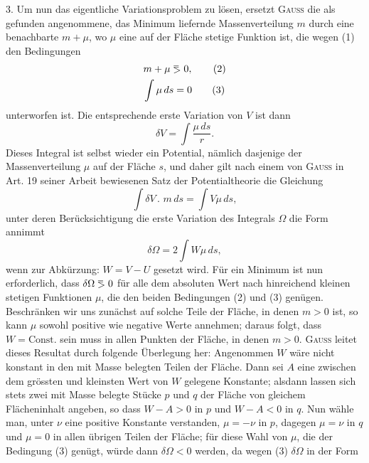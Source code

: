 \clearpage\begingroup\NoSourceHead{}
\renewcommand{\thefootnote}{\arabic{footnote})}\setcounter{footnote}{6}
\newcommand{\BolzaEqualAboveGreater}{\mathrel{\vcenter{\offinterlineskip\hbox{$\scriptstyle=$}\kern-.15ex\hbox{$>$}}}}
\noindent\hspace*{\parindent}3. Um nun das eigentliche Variationsproblem zu lösen, ersetzt \textsc{Gauss}
die als gefunden angenommene, das Minimum liefernde Massenverteilung $m$
durch eine benachbarte $m+\mu$, wo $\mu$ eine auf der Fläche stetige Funktion ist,
die wegen (1) den Bedingungen
\begin{gather*}
m+\mu\BolzaEqualAboveGreater0,\tag{2}\\
\int\mu\,ds=0\tag{3}
\end{gather*}
unterworfen ist. Die entsprechende erste Variation von $V$ ist dann
\[
\delta V=\int\frac{\mu\,ds}{r}.
\]
Dieses Integral ist selbst wieder ein Potential, nämlich dasjenige der Massenverteilung $\mu$ auf der Fläche $s$, und daher gilt nach einem von \textsc{Gauss} in Art. 19
seiner Arbeit bewiesenen Satz der Potentialtheorie die Gleichung
\[
\int\delta V\mathpunct{.}\,m\,ds=\int V\mu\,ds,
\]
unter deren Berücksichtigung die erste Variation des Integrals $\Omega$ die Form
annimmt
\[
\delta\Omega=2\int W\mu\,ds,
\]
wenn zur Abkürzung: $W=V-U$ gesetzt wird. Für ein Minimum ist nun
erforderlich, dass $\delta\Omega\BolzaEqualAboveGreater0$ für alle dem absoluten Wert nach hinreichend
kleinen stetigen Funktionen $\mu$, die den beiden Bedingungen (2) und (3) genügen. Beschränken wir uns zunächst auf solche Teile der Fläche, in denen
$m>0$ ist, so kann $\mu$ sowohl positive wie negative Werte annehmen; daraus
folgt, dass $W=\mathrm{Const.}$ sein muss in allen Punkten der Fläche, in denen
$m>0$. \textsc{Gauss} leitet dieses Resultat durch folgende Überlegung her: Angenommen $W$ wäre nicht konstant in den mit Masse belegten Teilen der Fläche.
Dann sei $A$ eine zwischen dem grössten und kleinsten Wert von $W$ gelegene
Konstante; alsdann lassen sich stets zwei mit Masse belegte Stücke $p$ und $q$
der Fläche von gleichem Flächeninhalt angeben, so dass $W-A>0$ in $p$ und
$W-A<0$ in $q$. Nun wähle man, unter $\nu$ eine positive Konstante verstanden, $\mu=-\nu$ in $p$, dagegen $\mu=\nu$ in $q$ und $\mu=0$ in allen übrigen Teilen
\clearpage{}
\noindent der Fläche; für diese Wahl von $\mu$, die der Bedingung (3) genügt, würde
dann $\delta\Omega<0$ werden, da wegen (3) $\delta\Omega$ in der Form
